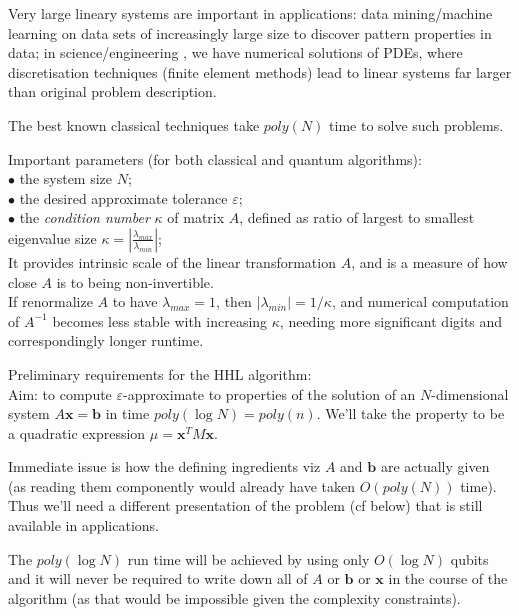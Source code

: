 \documentclass[a4paper]{article}
\begin{document}
Very large lineary systems are important in applications: data mining/machine learning on data sets of increasingly large size to discover pattern properties in data; in science/engineering , we have numerical solutions of PDEs, where discretisation techniques (finite element methods) lead to linear systems far larger than original problem description.

The best known classical techniques take $poly(N)$ time to solve such problems.

Important parameters (for both classical and quantum algorithms):\\
$\bullet$ the system size $N$;\\
$\bullet$ the desired approximate tolerance $\varepsilon$;\\
$\bullet$ the \emph{condition number} $\kappa$ of matrix $A$, defined as ratio of largest to smallest eigenvalue size $\kappa = |\frac{\lambda_{max}}{\lambda_{min}}|$;\\
It provides intrinsic scale of the linear transformation $A$, and is a measure of how close $A$ is to being non-invertible.\\
If renormalize $A$ to have $\lambda_{max} = 1$, then $|\lambda_{min}| = 1/\kappa$, and numerical computation of $A^{-1}$ becomes less stable with increasing $\kappa$, needing more significant digits and correspondingly longer runtime.

Preliminary requirements for the HHL algorithm:\\
Aim: to compute $\varepsilon$-approximate to properties of the solution of an $N$-dimensional system $A\mathbf{x} = \mathbf{b}$ in time $poly(\log N) = poly(n)$. We'll take the property to be a quadratic expression $\mu = \mathbf{x}^T M \mathbf{x}$.

Immediate issue is how the defining ingredients viz $A$ and $\mathbf{b}$ are actually given (as reading them componently would already have taken $O(poly(N))$ time). Thus we'll need a different presentation of the problem (cf below) that is still available in applications.

The $poly(\log N)$ run time will be achieved by using only $O(\log N)$ qubits and it will never be required to write down all of $A$ or $\mathbf{b}$ or $\mathbf{x}$ in the course of the algorithm (as that would be impossible given the complexity constraints).
\end{document}
